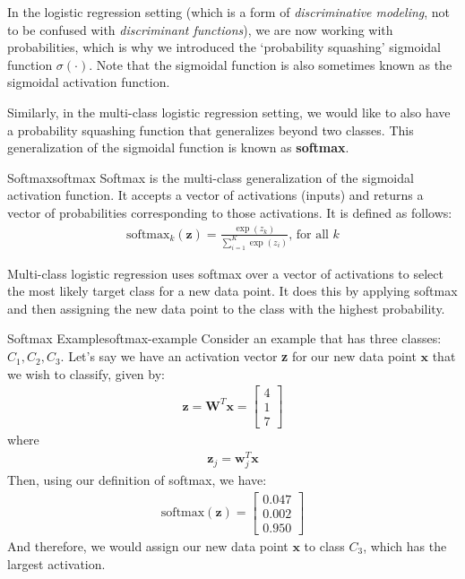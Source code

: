 In the logistic regression setting (which is a form of \textit{discriminative modeling}, not to be confused with \textit{discriminant functions}), we are now working with probabilities, which is why we introduced the `probability squashing' sigmoidal function $\sigma(\cdot)$. Note that the sigmoidal function is also sometimes known as the sigmoidal activation function.

Similarly, in the multi-class logistic regression setting, we would like to also have a probability squashing function that generalizes beyond two classes. This generalization of the sigmoidal function is known as \textbf{softmax}.

\begin{definition}{Softmax}{softmax}
Softmax is the multi-class generalization of the sigmoidal activation function. It accepts a vector of activations (inputs) and returns a vector of probabilities corresponding to those activations. It is defined as follows:
\begin{align*}
	\text{softmax}_{k}(\textbf{z}) = \frac{\exp{(z_{k})}}{\sum_{i=1}^{K} \exp{(z_{i})}}\text{, for all $k$}
\end{align*}
\end{definition}

Multi-class logistic regression uses softmax over a vector of activations to select the most likely target class for a new data point. It does this by applying softmax and then assigning the new data point to the class with the highest probability.

\begin{example}{Softmax Example}{softmax-example}
	Consider an example that has three classes: $C_{1}, C_{2}, C_{3}$. Let's say we have an activation vector \textbf{z} for our new data point $\textbf{x}$ that we wish to classify, given by:
	\begin{align*}
		\textbf{z} = \textbf{W}^{T}\textbf{x} =
			\begin{bmatrix}
		    	4 \\
		        1 \\
		        7
		    \end{bmatrix}
	\end{align*}
	where
	\begin{align*}
		\textbf{z}_{j} = \textbf{w}_{j}^{T}\textbf{x}
	\end{align*}
	Then, using our definition of softmax, we have:
	\begin{align*}
		\text{softmax}(\textbf{z}) =
			\begin{bmatrix}
				0.047 \\
				0.002 \\
				0.950
		    \end{bmatrix}
	\end{align*}
	And therefore, we would assign our new data point $\textbf{x}$ to class $C_{3}$, which has the largest activation.
\end{example}

